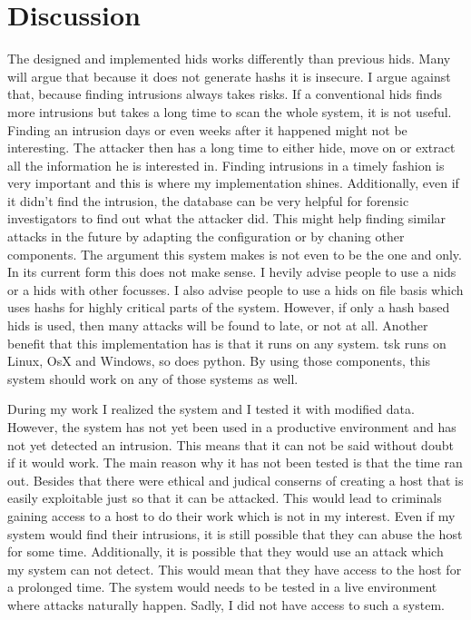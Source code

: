 
\chapter{Discussion}
\label{sec:Discussion}

The designed and implemented \gls{hids} works differently than previous \gls{hids}. Many will argue that because it does not generate \glspl{hash} it is insecure. I argue against that, because finding intrusions always takes risks. If a conventional \gls{hids} finds more intrusions but takes a long time to scan the whole system, it is not useful. Finding an intrusion days or even weeks after it happened might not be interesting. The attacker then has a long time to either hide, move on or extract all the information he is interested in. Finding intrusions in a timely fashion is very important and this is where my implementation shines. Additionally, even if it didn't find the intrusion, the database can be very helpful for forensic investigators to find out what the attacker did. This might help finding similar attacks in the future by adapting the configuration or by chaning other components. The argument this system makes is not even to be the one and only. In its current form this does not make sense. I hevily advise people to use a \gls{nids} or a \gls{hids} with other focusses. I also advise people to use a \gls{hids} on file basis which uses \glspl{hash} for highly critical parts of the system. However, if only a hash based \gls{hids} is used, then many attacks will be found to late, or not at all. Another benefit that this implementation has is that it runs on any system. \gls{tsk} runs on Linux, OsX and Windows, so does python. By using those components, this system should work on any of those systems as well.

During my work I realized the system and I tested it with modified data. However, the system has not yet been used in a productive environment and has not yet detected an intrusion. This means that it can not be said without doubt if it would work. The main reason why it has not been tested is that the time ran out. Besides that there were ethical and judical conserns of creating a host that is easily exploitable just so that it can be attacked. This would lead to criminals gaining access to a host to do their work which is not in my interest. Even if my system would find their intrusions, it is still possible that they can abuse the host for some time. Additionally, it is possible that they would use an attack which my system can not detect. This would mean that they have access to the host for a prolonged time. The system would needs to be tested in a live environment where attacks naturally happen. Sadly, I did not have access to such a system. 

